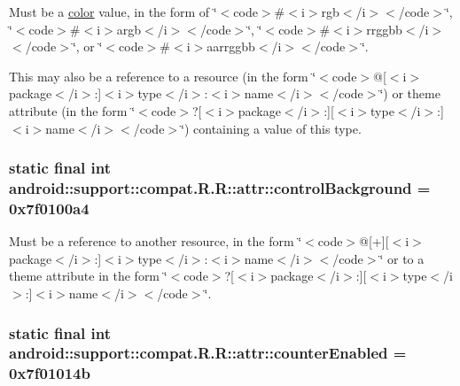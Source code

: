 Must be a \hyperlink{classandroid_1_1support_1_1compat_1_1_r_1_1color}{color} value, in the form of \char`\"{}$<$code$>$\#$<$i$>$rgb$<$/i$>$$<$/code$>$\char`\"{}, \char`\"{}$<$code$>$\#$<$i$>$argb$<$/i$>$$<$/code$>$\char`\"{}, \char`\"{}$<$code$>$\#$<$i$>$rrggbb$<$/i$>$$<$/code$>$\char`\"{}, or \char`\"{}$<$code$>$\#$<$i$>$aarrggbb$<$/i$>$$<$/code$>$\char`\"{}. 

This may also be a reference to a resource (in the form \char`\"{}$<$code$>$@\mbox{[}$<$i$>$package$<$/i$>$:\mbox{]}$<$i$>$type$<$/i$>$:$<$i$>$name$<$/i$>$$<$/code$>$\char`\"{}) or theme attribute (in the form \char`\"{}$<$code$>$?\mbox{[}$<$i$>$package$<$/i$>$:\mbox{]}\mbox{[}$<$i$>$type$<$/i$>$:\mbox{]}$<$i$>$name$<$/i$>$$<$/code$>$\char`\"{}) containing a value of this type. \hypertarget{classandroid_1_1support_1_1compat_1_1_r_1_1attr_cfb404a000df52569342dd69e79fea09}{
\subsubsection[{controlBackground}]{\setlength{\rightskip}{0pt plus 5cm}static final int android::support::compat.R.R::attr::controlBackground = 0x7f0100a4}}
\label{classandroid_1_1support_1_1compat_1_1_r_1_1attr_cfb404a000df52569342dd69e79fea09}


Must be a reference to another resource, in the form \char`\"{}$<$code$>$@\mbox{[}+\mbox{]}\mbox{[}$<$i$>$package$<$/i$>$:\mbox{]}$<$i$>$type$<$/i$>$:$<$i$>$name$<$/i$>$$<$/code$>$\char`\"{} or to a theme attribute in the form \char`\"{}$<$code$>$?\mbox{[}$<$i$>$package$<$/i$>$:\mbox{]}\mbox{[}$<$i$>$type$<$/i$>$:\mbox{]}$<$i$>$name$<$/i$>$$<$/code$>$\char`\"{}. \hypertarget{classandroid_1_1support_1_1compat_1_1_r_1_1attr_9d532166667e2327c5e229bad84f96f5}{
\subsubsection[{counterEnabled}]{\setlength{\rightskip}{0pt plus 5cm}static final int android::support::compat.R.R::attr::counterEnabled = 0x7f01014b}}
\label{classandroid_1_1support_1_1compat_1_1_r_1_1attr_9d532166667e2327c5e229bad84f96f5}


